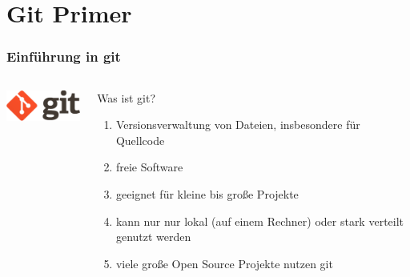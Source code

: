 \documentclass[ucs,9pt]{beamer}
\begin{document}
\section{Git Primer}
\begin{frame}
    \frametitle{Einführung in git}
  \begin{columns}
    \begin{column}{0.3\textwidth}
  \begin{center}
    \includegraphics[width=3cm]{git_logo}
  \end{center}
\end{column}
    \begin{column}{0.7\textwidth}
  \begin{block}{Was ist git?}
      \begin{enumerate}
          \item Versionsverwaltung von Dateien, insbesondere für Quellcode
          \item freie Software
          \item geeignet für kleine bis große Projekte
          \item kann nur nur lokal (auf einem Rechner) oder stark verteilt
              genutzt werden
          \item viele große Open Source Projekte nutzen git
      \end{enumerate}
  \end{block}
\end{column}
  \end{columns}
  \end{frame}
\end{document}
